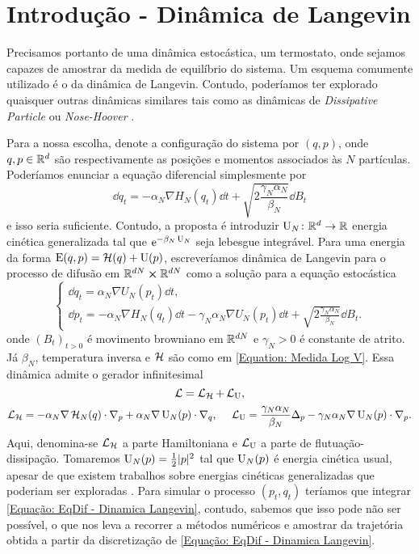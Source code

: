 \section{Introdução - Dinâmica de Langevin}

Precisamos portanto de uma dinâmica estocástica, um termostato, onde sejamos capazes de amostrar da medida de equilíbrio do sistema. Um esquema comumente utilizado é o da dinâmica de Langevin. Contudo, poderíamos ter explorado quaisquer outras dinâmicas similares tais como as dinâmicas de \textit{Dissipative Particle} \cite{DPD} ou \textit{Nose-Hoover} \cite{Hoover}.

Para a nossa escolha, denote a configuração do sistema por $(q, p)$, onde $q,p \in \mathbb{R}^d$ são respectivamente as posições e momentos associados às $N$ partículas. Poderíamos enunciar a equação diferencial simplesmente por $$\dd q_t = -\alpha_N \nabla H_N(q_t) \dd t + \sqrt{2\frac{\gamma_N \alpha_N}{\beta_N}} \dd B_t$$ e isso seria suficiente. Contudo, a proposta é introduzir $\operatorname{U}_N \colon \mathbb{R}^d \rightarrow \mathbb{R}$ energia cinética generalizada tal que $\operatorname{\textrm e}^{-\beta_N \operatorname{U}_N}$ seja lebesgue integrável. Para uma energia da forma $\operatorname{E}(q,p) = \operatorname{\mathcal{H}}(q) + \operatorname{U}(p)$, escreveríamos dinâmica de Langevin para o processo de difusão em $\mathbb{R}^{dN} \cross \mathbb{R}^{dN}$ como a solução para a equação estocástica \cite{Stoltz2018} 
\begin{equation}
\begin{cases}
	\dd q_t = \alpha_N \nabla U_N (p_t) \dd t, \\
	\dd p_t = -\alpha_N \nabla H_N(q_t) \dd t - \gamma_N \alpha_N \nabla U_N(p_t) \dd t + \sqrt{2\frac{\gamma_N \alpha_N}{\beta_N}} \dd B_t.
\end{cases}
\label{Equação: EqDif - Dinamica Langevin}
\end{equation}
onde $(B_t)_{t>0}$ é movimento browniano em $\mathbb{R}^{dN}$ e $\gamma_N > 0$ é constante de atrito. Já $\beta_N$, temperatura inversa e $\operatorname{\mathcal{H}}$ são como em \ref{Equation: Medida Log V}. Essa dinâmica admite o gerador infinitesimal 
\[
	\operatorname{\mathcal{L}} = \operatorname{\mathcal{L}}_{\operatorname{\mathcal{H}}} + \operatorname{\mathcal{L}}_{\operatorname{U}},
\]
\[
 \operatorname{\mathcal{L}}_{\operatorname{\mathcal{H}}} = -\alpha_N \nabla\operatorname{\mathcal{H}}_N(q) \cdot \nabla_p + \alpha_N \nabla \operatorname{U}_N(p) \cdot \nabla_q, \ \ \ \ \operatorname{\mathcal{L}}_{\operatorname{U}} = \frac{\gamma_N\alpha_N}{\beta_N} \Delta_p - \gamma_N \alpha_N \nabla \operatorname{U}_N(p) \cdot \nabla_p.
\]
Aqui, denomina-se $\operatorname{\mathcal{L}}_{\operatorname{\mathcal{H}}}$ a parte Hamiltoniana e $\operatorname{\mathcal{L}}_{\operatorname{U}}$ a parte de flutuação-dissipação. Tomaremos $\operatorname{U}_N(p) = \frac{1}{2} |p|^2$ tal que $\operatorname{U}_N(p)$ é energia cinética usual, apesar de que existem trabalhos sobre energias cinéticas generalizadas que poderiam ser exploradas \cite{Stoltz2018}. Para simular o processo $(p_t,q_t)$ teríamos que integrar \ref{Equação: EqDif - Dinamica Langevin}, contudo, sabemos que isso pode não ser possível, o que nos leva a recorrer a métodos numéricos e amostrar da trajetória obtida a partir da discretização de \ref{Equação: EqDif - Dinamica Langevin}. 